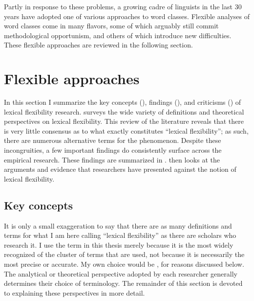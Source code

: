 
Partly in response to these problems, a growing cadre of linguists in the last 30 years have adopted one of various  approaches to word classes. Flexible analyses of word classes come in many flavors, some of which arguably still commit methodological opportunism, and others of which introduce new difficulties. These flexible approaches are reviewed in the following section.

\section{Flexible approaches}
\label{sec:2.3}

In this section I summarize the key concepts (), findings (), and criticisms () of lexical flexibility research.  surveys the wide variety of definitions and theoretical perspectives on lexical flexibility. This review of the literature reveals that there is very little consensus as to what exactly constitutes \enquote{lexical flexibility}; as such, there are numerous alternative terms for the phenomenon. Despite these incongruities, a few important findings do consistently surface across the empirical research. These findings are summarized in .  then looks at the arguments and evidence that researchers have presented against the notion of lexical flexibility.

\subsection{Key concepts}
\label{sec:2.3.1}

It is only a small exaggeration to say that there are as many definitions and terms for what I am here calling \enquote{lexical flexibility} as there are scholars who research it. I use the term  in this thesis merely because it is the most widely recognized of the cluster of terms that are used, not because it is necessarily the most precise or accurate. My own choice would be , for reasons discussed below. The analytical or theoretical perspective adopted by each researcher generally determines their choice of terminology. The remainder of this section is devoted to explaining these perspectives in more detail.

